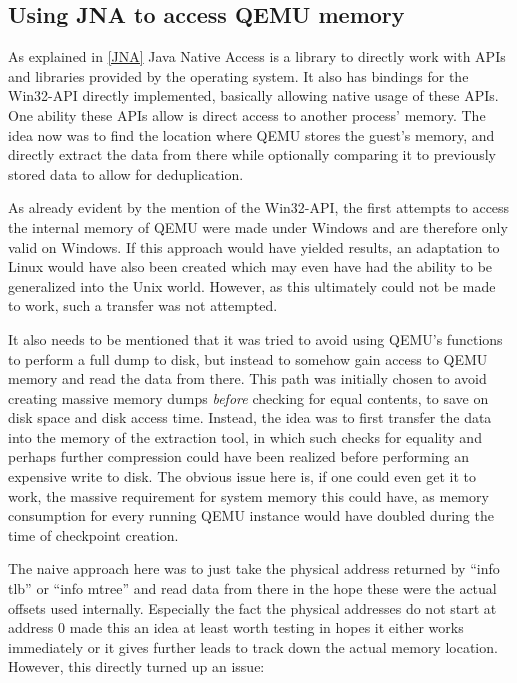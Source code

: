 \subsection{Using JNA to access QEMU memory}
As explained in \autoref{JNA} Java Native Access is a library to directly work with APIs and libraries provided by the operating system.
It also has bindings for the Win32-API directly implemented,
basically allowing native usage of these APIs.
One ability these APIs allow is direct access to another process' memory.
The idea now was to find the location where QEMU stores the guest's memory,
and directly extract the data from there while optionally comparing it to previously stored data
to allow for deduplication.

As already evident by the mention of the Win32-API,
the first attempts to access the internal memory of QEMU were made under Windows
and are therefore only valid on Windows.
If this approach would have yielded results,
an adaptation to Linux would have also been created
which may even have had the ability to be generalized into the Unix world.
However, as this ultimately could not be made to work,
such a transfer was not attempted.

It also needs to be mentioned that it was tried to avoid using QEMU's functions to perform a full dump to disk,
but instead to somehow gain access to QEMU memory and read the data from there.
This path was initially chosen to avoid creating massive memory dumps \emph{before} checking for equal contents,
to save on disk space and disk access time.
Instead, the idea was to first transfer the data into the memory of the extraction tool,
in which such checks for equality and perhaps further compression could have been realized
before performing an expensive write to disk.
The obvious issue here is, if one could even get it to work,
the massive requirement for system memory this could have,
as memory consumption for every running QEMU instance would have doubled
during the time of checkpoint creation.

The naive approach here was to just take the physical address returned by \enquote{info tlb} or \enquote{info mtree}
and read data from there in the hope these were the actual offsets used internally.
Especially the fact the physical addresses do not start at address 0
made this an idea at least worth testing
in hopes it either works immediately or it gives further leads to track down the actual memory location.
However, this directly turned up an issue:

